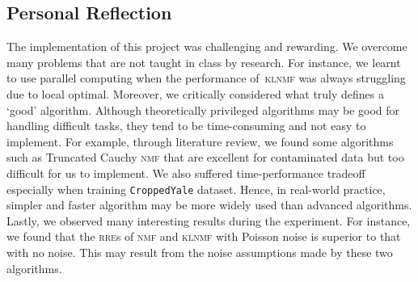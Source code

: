 \subsection{Personal Reflection}
The implementation of this project was challenging and rewarding. We overcome many problems that are not taught in class by research. For instance, we learnt to use parallel computing when the performance of~\textsc{klnmf} was always struggling due to local optimal. 
Moreover, we critically considered what truly defines a `good' algorithm. Although theoretically privileged algorithms may be good for handling difficult tasks, they tend to be time-consuming and not easy to implement. For example, through literature review, we found some algorithms such as Truncated Cauchy \textsc{nmf} \citet{guan2017truncated} that are excellent for contaminated data but too difficult for us to implement. We also suffered time-performance tradeoff especially when training \texttt{CroppedYale} dataset. Hence, in real-world practice, simpler and faster algorithm may be more widely used than advanced algorithms. 
Lastly, we observed many interesting results during the experiment. For instance, we found that the \textsc{rre}s of \textsc{nmf} and \textsc{klnmf} with Poisson noise is superior to that with no noise. %
This may result from the noise assumptions made by these two algorithms. 
